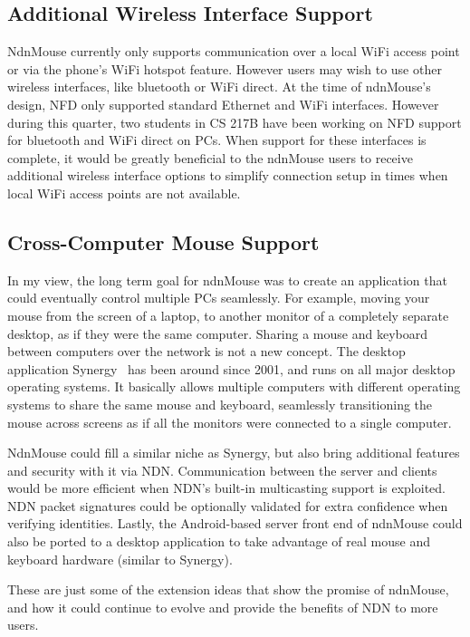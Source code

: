 \documentclass{sig-alternate}
\renewcommand\_{\textunderscore\allowbreak}  %
\begin{document}
\subsection{Additional Wireless Interface Support}
NdnMouse currently only supports communication over a local WiFi access point or via the phone's WiFi hotspot feature. However users may wish to use other wireless interfaces, like bluetooth or WiFi direct. At the time of ndnMouse's design, NFD only supported standard Ethernet and WiFi interfaces. However during this quarter, two students in CS 217B have been working on NFD support for bluetooth and WiFi direct on PCs. When support for these interfaces is complete, it would be greatly beneficial to the ndnMouse users to receive additional wireless interface options to simplify connection setup in times when local WiFi access points are not available.

\subsection{Cross-Computer Mouse Support}
In my view, the long term goal for ndnMouse was to create an application that could eventually control multiple PCs seamlessly. For example, moving your mouse from the screen of a laptop, to another monitor of a completely separate desktop, as if they were the same computer. Sharing a mouse and keyboard between computers over the network is not a new concept. The desktop application Synergy~\cite{synergy} has been around since 2001, and runs on all major desktop operating systems. It basically allows multiple computers with different operating systems to share the same mouse and keyboard, seamlessly transitioning the mouse across screens as if all the monitors were connected to a single computer.

NdnMouse could fill a similar niche as Synergy, but also bring additional features and security with it via NDN. Communication between the server and clients would be more efficient when NDN's built-in multicasting support is exploited. NDN packet signatures could be optionally validated for extra confidence when verifying identities. Lastly, the Android-based server front end of ndnMouse could also be ported to a desktop application to take advantage of real mouse and keyboard hardware (similar to Synergy).

These are just some of the extension ideas that show the promise of ndnMouse, and how it could continue to evolve and provide the benefits of NDN to more users.
\end{document}
